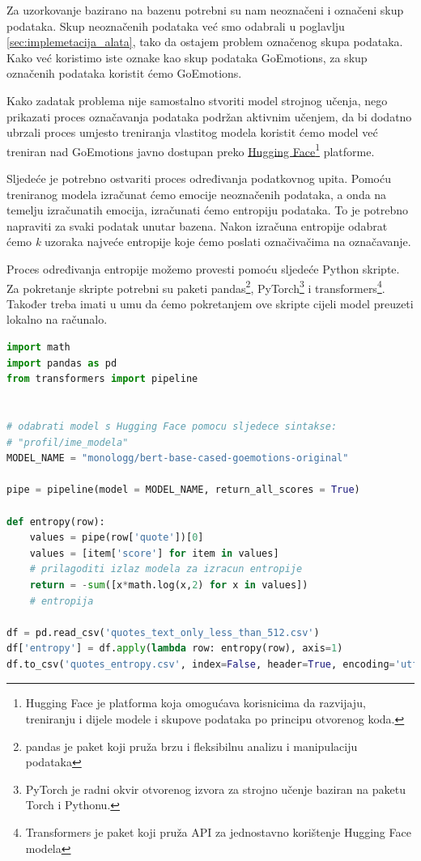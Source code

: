 \documentclass[times, utf8, zavrsni, numeric]{fer}
\begin{document}
Za uzorkovanje bazirano na bazenu potrebni su nam neoznačeni i označeni skup podataka. Skup neoznačenih podataka već smo odabrali u poglavlju \autoref{sec:implemetacija_alata}, tako da ostajem problem označenog skupa podataka. Kako već koristimo iste oznake kao skup podataka GoEmotions, za skup označenih podataka koristit ćemo GoEmotions. 

Kako zadatak problema nije samostalno stvoriti model strojnog učenja, nego prikazati proces označavanja podataka podržan aktivnim učenjem, da bi dodatno ubrzali proces umjesto treniranja vlastitog modela koristit ćemo model već treniran nad GoEmotions javno dostupan preko \href{https://huggingface.co/}{Hugging Face}\footnote{Hugging Face je platforma koja omogućava korisnicima da razvijaju, treniranju i dijele modele i skupove podataka po principu otvorenog koda.} platforme. \citep{goemotionsmodel}

Sljedeće je potrebno ostvariti proces određivanja podatkovnog upita. Pomoću treniranog modela izračunat ćemo emocije neoznačenih podataka, a onda na temelju izračunatih emocija, izračunati ćemo entropiju podataka. To je potrebno napraviti za svaki podatak unutar bazena. Nakon izračuna entropije odabrat ćemo \textit{k} uzoraka najveće entropije koje ćemo poslati označivačima na označavanje.

Proces određivanja entropije možemo provesti pomoću sljedeće Python skripte. 
Za pokretanje skripte potrebni su paketi pandas\footnote{pandas je paket koji pruža brzu i fleksibilnu analizu i manipulaciju podataka}, PyTorch\footnote{PyTorch je radni okvir otvorenog izvora za strojno učenje baziran na paketu Torch i Pythonu.} i transformers\footnote{Transformers je paket koji pruža API za jednostavno korištenje Hugging Face modela}. Također treba imati u umu da ćemo pokretanjem ove skripte cijeli model preuzeti lokalno na računalo. 

\begin{lstlisting}[language = python]
import math
import pandas as pd
from transformers import pipeline


# odabrati model s Hugging Face pomocu sljedece sintakse:
# "profil/ime_modela"
MODEL_NAME = "monologg/bert-base-cased-goemotions-original"

pipe = pipeline(model = MODEL_NAME, return_all_scores = True)

def entropy(row):
    values = pipe(row['quote'])[0]
    values = [item['score'] for item in values]  
    # prilagoditi izlaz modela za izracun entropije
    return = -sum([x*math.log(x,2) for x in values])
    # entropija

df = pd.read_csv('quotes_text_only_less_than_512.csv')
df['entropy'] = df.apply(lambda row: entropy(row), axis=1)
df.to_csv('quotes_entropy.csv', index=False, header=True, encoding='utf8')
\end{lstlisting}
\end{document}
